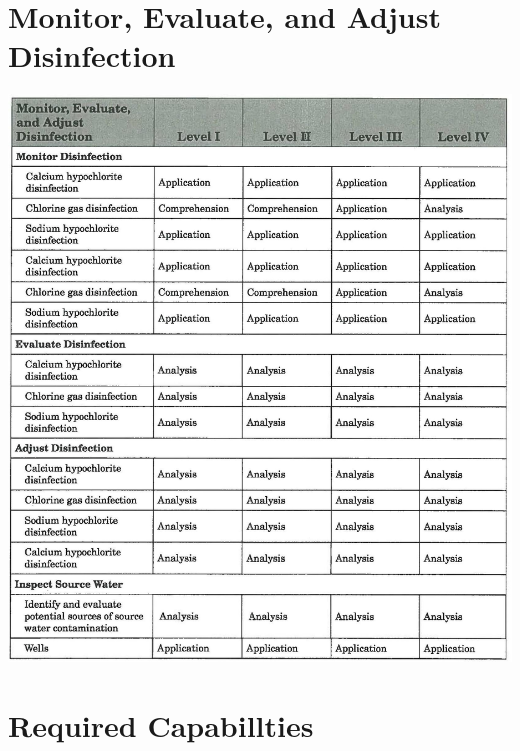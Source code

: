 \documentclass[10pt]{article}
\begin{document}
\section{Monitor, Evaluate, and Adjust Disinfection}
\includegraphics[max width=\textwidth]{2022_11_10_beeca89b60229885003dg-09}

\section{Required Capabillties}
\end{document}

